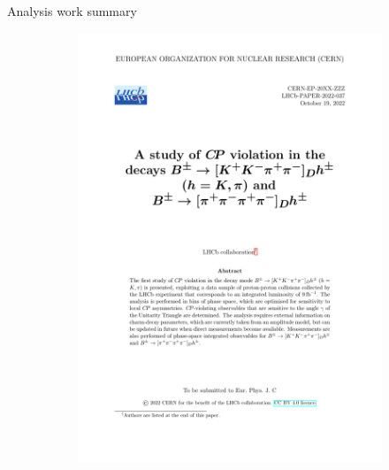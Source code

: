 \documentclass{beamer}
\begin{document}
\begin{frame}{Analysis work summary}
\begin{figure}
\begin{subfigure}{0.35\textwidth}
    \end{subfigure}%
    \hspace{1cm}
    \begin{subfigure}{0.35\textwidth}
      \includegraphics[width = 1.0\textwidth, page = 1]{Plots/LHCb-PAPER-2022-037-v3.pdf}
    \end{subfigure}
  \end{figure}
\end{frame}
\end{document}
